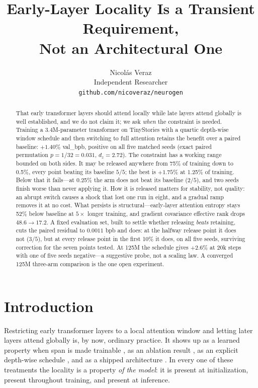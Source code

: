 \documentclass[11pt,a4paper]{article}
\title{Early-Layer Locality Is a Transient Requirement,\\Not an Architectural One}
\author{
Nicol\'as Veraz\\
Independent Researcher\\
\texttt{github.com/nicoveraz/neurogen}
}
\date{}
\begin{document}
\maketitle

\begin{abstract}
That early transformer layers should attend locally while late layers attend globally is well established, and we do not claim it; we ask \emph{when} the constraint is needed. Training a 3.4M-parameter transformer on TinyStories with a quartic depth-wise window schedule and then switching to full attention retains the benefit over a paired baseline: $+1.40$\% val\_bpb, positive on all five matched seeds (exact paired permutation $p=1/32=0.031$, $d_z=2.72$). The constraint has a working range bounded on both sides. It may be released anywhere from 75\% of training down to 0.5\%, every point beating its baseline $5/5$; the best is $+1.75$\% at 1.25\% of training. Below that it fails---at 0.25\% the arm does not beat its baseline ($2/5$), and two seeds finish worse than never applying it. How it is released matters for stability, not quality: an abrupt switch causes a shock that lost one run in eight, and a gradual ramp removes it at no cost. What persists is structural---early-layer attention entropy stays 52\% below baseline at $5\times$ longer training, and gradient covariance effective rank drops $48.6 \rightarrow 17.2$. A fixed evaluation set, built to settle whether releasing \emph{beats} retaining, cuts the paired residual to $0.0011$ bpb and does: at the halfway release point it does not ($3/5$), but at every release point in the first 10\% it does, on all five seeds, surviving correction for the seven points tested. At 125M the schedule gives $+2.6$\% at 20k steps with one of five seeds negative---a suggestive probe, not a scaling law. A converged 125M three-arm comparison is the one open experiment.
\end{abstract}

\section{Introduction}

Restricting early transformer layers to a local attention window and letting later layers attend globally is, by now, ordinary practice. It shows up as a learned property when span is made trainable \citep{sukhbaatar2019adaptive}, as an ablation result \citep{rae2020deep}, as an explicit depth-wise schedule \citep{xu2025mswa}, and as a shipped architecture \citep{jiang2023mistral,gemma3}. In every one of these treatments the locality is a property \emph{of the model}: it is present at initialization, present throughout training, and present at inference.
\end{document}

